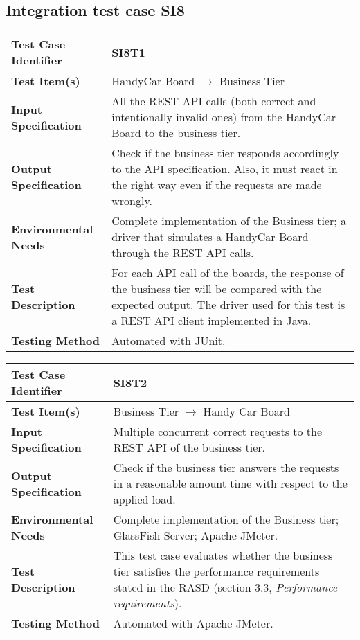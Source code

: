 \vspace{2em}


\subsection{Integration test case SI8}
\label{sec:performance-business}

\begin{tabular}{l p{}}
    \hline
    \textbf{Test Case Identifier} & SI8T1\\
    \hline
    \textbf{Test Item(s)} & HandyCar Board $\rightarrow$ Business Tier\\
    \hline
    \textbf{Input Specification} & All the REST API calls (both correct and intentionally invalid ones) from the HandyCar Board to the business tier.\\
    \hline
    \textbf{Output Specification} & Check if the business tier responds accordingly to the API specification. Also, it must react in the right way even if the requests are made wrongly.\\
    \hline
    \textbf{Environmental Needs} & Complete implementation of the Business tier; a driver that simulates a HandyCar Board through the REST API calls. \\
    \hline
    \textbf{Test Description} & For each API call of the boards, the response of the business tier will be compared with the expected output. The driver used for this test is a REST API client implemented in Java.\\
    \hline
    \textbf{Testing Method} & Automated with JUnit.\\
    \hline
\end{tabular}

\vspace{2em}

\noindent\begin{tabular}{l p{}}
    \hline
    \textbf{Test Case Identifier} & SI8T2\\
    \hline
    \textbf{Test Item(s)} & Business Tier $\rightarrow$ Handy Car Board\\
    \hline
    \textbf{Input Specification} & Multiple concurrent correct requests to the REST API of the business tier.\\
    \hline
    \textbf{Output Specification} & Check if the business tier answers the requests in a reasonable amount time with respect to the applied load. \\
    \hline
    \textbf{Environmental Needs} & Complete implementation of the Business tier; GlassFish Server; Apache JMeter.\\
    \hline
    \textbf{Test Description} & This test case evaluates whether the business tier satisfies the performance requirements stated in the RASD (section 3.3, \emph{Performance requirements}).\\
    \hline
    \textbf{Testing Method} & Automated with Apache JMeter. \\
    \hline
\end{tabular}